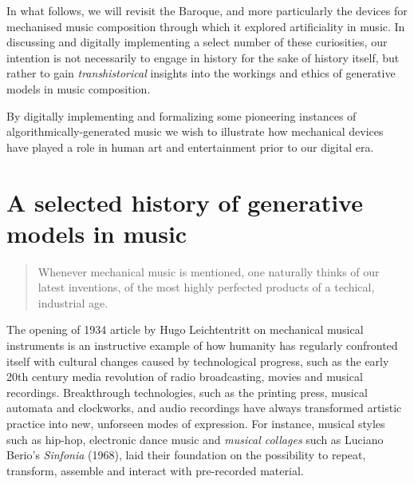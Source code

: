 \documentclass{article}
\begin{document}

In what follows, we will revisit the Baroque, and more particularly the devices for mechanised music composition through which it explored artificiality in music. In discussing and digitally implementing a select number of these curiosities, our intention is not necessarily to engage in history for the sake of history itself, but rather to gain \textit{transhistorical} insights into the workings and ethics of generative models in music composition.

By digitally implementing and formalizing some pioneering instances of  algorithmically-generated music we wish to illustrate how mechanical devices have played a role in human art and entertainment prior to our digital era.


\section{A selected history of generative models in music}\label{sec:models}

\begin{quote}
Whenever mechanical music is mentioned, one naturally thinks of our latest inventions, of the most highly perfected products of a techical, industrial age.\cite{leichtentrittMechanicalMusicOlden1934}
\end{quote}

The opening of 1934 article by Hugo Leichtentritt on mechanical musical instruments is an instructive example of how humanity has regularly confronted itself with cultural changes caused by technological progress, such as the early 20th century media revolution of radio broadcasting, movies and musical recordings. \cite{mooreDigitalReproducibilityCulture2012}
Breakthrough technologies, such as the printing press, musical automata and clockworks, and audio recordings have always transformed artistic practice into new, unforseen modes of expression. For instance, musical styles such as hip-hop, electronic dance music and \textit{musical collages} such as Luciano Berio's \textit{Sinfonia} (1968),\cite{losadaModernismPostmodernismStrands2009} laid their foundation on the possibility to repeat, transform, assemble and interact with pre-recorded material. 
\end{document}
